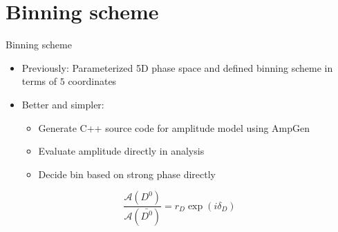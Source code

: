 \documentclass{beamer}
\begin{document}
\section{Binning scheme}
\begin{frame}{Binning scheme}
  \begin{itemize}
    \setlength\itemsep{1.5em}
    \item{Previously: Parameterized 5D phase space and defined binning scheme in terms of $5$ coordinates}
    \item{Better and simpler:}
    \begin{itemize}
      \item{Generate C++ source code for amplitude model using AmpGen}
      \item{Evaluate amplitude directly in analysis}
      \item{Decide bin based on strong phase directly}
    \end{itemize}
  \end{itemize}
  \vspace{1cm}
  \begin{equation*}
    \frac{\mathcal{A}(D^0)}{\mathcal{A}(\bar{D^0})} = r_D\exp(i\delta_D)
  \end{equation*}
\end{frame}
\end{document}

